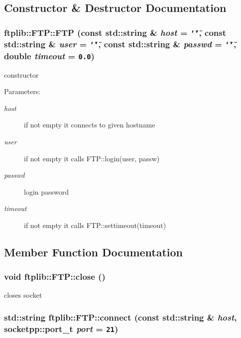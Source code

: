\subsection{Constructor \& Destructor Documentation}
\hypertarget{classftplib_1_1FTP_178979abdc58593abdb31a882f370803}{
\subsubsection[{FTP}]{\setlength{\rightskip}{0pt plus 5cm}ftplib::FTP::FTP (const std::string \& {\em host} = {\tt \char`\"{}\char`\"{}}, \/  const std::string \& {\em user} = {\tt \char`\"{}\char`\"{}}, \/  const std::string \& {\em passwd} = {\tt \char`\"{}\char`\"{}}, \/  double {\em timeout} = {\tt 0.0})}}
\label{classftplib_1_1FTP_178979abdc58593abdb31a882f370803}


constructor 

\begin{Desc}
\item[Parameters:]
\begin{description}
\item[{\em host}]if not empty it connects to given hostname \item[{\em user}]if not empty it calls FTP::login(user, passw) \item[{\em passwd}]login password \item[{\em timeout}]if not empty it calls FTP::settimeout(timeout) \end{description}
\end{Desc}


\subsection{Member Function Documentation}
\hypertarget{classftplib_1_1FTP_4f36be9f23721435f19a7e5b1d702718}{
\subsubsection[{close}]{\setlength{\rightskip}{0pt plus 5cm}void ftplib::FTP::close ()}}
\label{classftplib_1_1FTP_4f36be9f23721435f19a7e5b1d702718}


closes socket 

\hypertarget{classftplib_1_1FTP_fbd3444a33e5dd055474c9a0d6aabba5}{
\subsubsection[{connect}]{\setlength{\rightskip}{0pt plus 5cm}std::string ftplib::FTP::connect (const std::string \& {\em host}, \/  {\bf socketpp::port\_\-t} {\em port} = {\tt 21})}}
\label{classftplib_1_1FTP_fbd3444a33e5dd055474c9a0d6aabba5}


